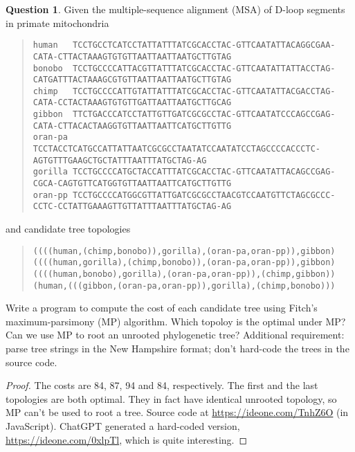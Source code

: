 \documentclass{article}[10pt]
\theoremstyle{definition}\newtheorem{question}{Question}
\begin{document}
\begin{question}
Given the multiple-sequence alignment (MSA) of D-loop segments in primate mitochondria
\begin{quote}
\footnotesize\verb|human   TCCTGCCTCATCCTATTATTTATCGCACCTAC-GTTCAATATTACAGGCGAA-CATA-CTTACTAAAGTGTGTTAATTAATTAATGCTTGTAG|\\
\footnotesize\verb|bonobo  TCCTGCCCCATTACGTTATTTATCGCACCTAC-GTTCAATATTATTACCTAG-CATGATTTACTAAAGCGTGTTAATTAATTAATGCTTGTAG|\\
\footnotesize\verb|chimp   TCCTGCCCCATTGTATTATTTATCGCACCTAC-GTTCAATATTACGACCTAG-CATA-CCTACTAAAGTGTGTTGATTAATTAATGCTTGCAG|\\
\footnotesize\verb|gibbon  TTCTGACCCATCCTATTGTTGATCGCGCCTAC-GTTCAATATCCCAGCCGAG-CATA-CTTACACTAAGGTGTTAATTAATTCATGCTTGTTG|\\
\footnotesize\verb|oran-pa TCCTACCTCATGCCATTATTAATCGCGCCTAATATCCAATATCCTAGCCCCACCCTC-AGTGTTTGAAGCTGCTATTTAATTTATGCTAG-AG|\\
\footnotesize\verb|gorilla TCCTGCCCCATGCTACCATTTATCGCACCTAC-GTTCAATATTACAGCCGAG-CGCA-CAGTGTTCATGGTGTTAATTAATTCATGCTTGTTG|\\
\footnotesize\verb|oran-pp TCCTGCCCCATGGCGTTATTGATCGCGCCTAACGTCCAATGTTCTAGCGCCC-CCTC-CCTATTGAAAGTTGTTATTTAATTTATGCTAG-AG|
\end{quote}
and candidate tree topologies
\begin{quote}
\footnotesize\tt ((((human,(chimp,bonobo)),gorilla),(oran-pa,oran-pp)),gibbon)\\
\footnotesize\tt ((((human,gorilla),(chimp,bonobo)),(oran-pa,oran-pp)),gibbon)\\
\footnotesize\tt ((((human,bonobo),gorilla),(oran-pa,oran-pp)),(chimp,gibbon))\\
\footnotesize\tt (human,(((gibbon,(oran-pa,oran-pp)),gorilla),(chimp,bonobo)))
\end{quote}
Write a program to compute the cost of each candidate tree using Fitch's maximum-parsimony (MP) algorithm.
Which topoloy is the optimal under MP? Can we use MP to root an unrooted phylogenetic tree?
Additional requirement: parse tree strings in the New Hampshire format; don't hard-code the trees in the source code.
\end{question}

\begin{proof}
The costs are 84, 87, 94 and 84, respectively. The first and the last topologies are both optimal.
They in fact have identical unrooted topology, so MP can't be used to root a tree.
Source code at \url{https://ideone.com/TnhZ6O} (in JavaScript).
ChatGPT generated a hard-coded version, \url{https://ideone.com/0xlpTl}, which is quite interesting.
\end{proof}
\end{document}
